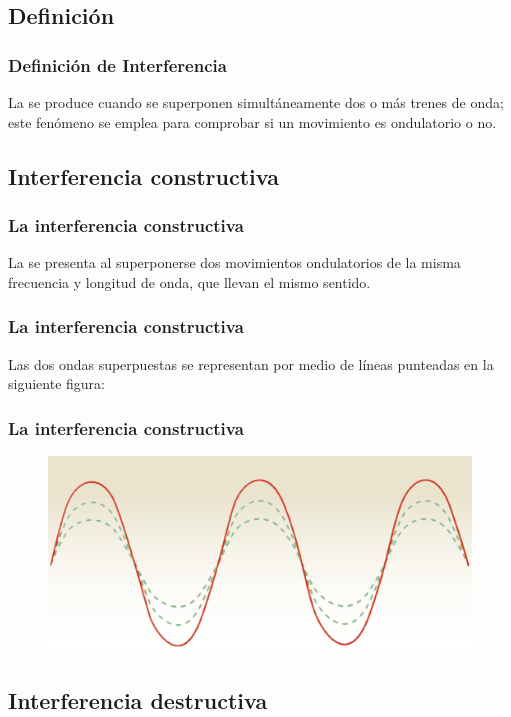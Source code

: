 \documentclass[14pt]{beamer}
\begin{document}
\subsection{Definición}

\begin{frame}
\frametitle{Definición de Interferencia}
La  se produce cuando se superponen simultáneamente dos o más trenes de onda; \pause este fenómeno se emplea para comprobar si un movimiento es ondulatorio o no.
\end{frame}

\subsection{Interferencia constructiva}

\begin{frame}
\frametitle{La interferencia constructiva}
La  se presenta al superponerse dos movimientos ondulatorios de la misma frecuencia y longitud de onda, que llevan el mismo sentido.
\end{frame}
\begin{frame}
\frametitle{La interferencia constructiva}
Las dos ondas superpuestas se representan por medio de líneas punteadas en la siguiente figura:
\end{frame}
\begin{frame}
\frametitle{La interferencia constructiva}
\begin{figure}
    \centering
    \includegraphics[scale=0.8]{Imagenes/Onda_Constructiva.png}
\end{figure}
\end{frame}

\subsection{Interferencia destructiva}
\end{document}
